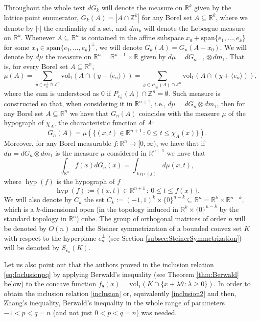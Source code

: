 \documentclass[10pt]{amsart}
\def\hyp{\mathop\mathrm{hyp}\nolimits}
\def\R{\mathbb{R}}
\def\Z{\mathbb{Z}}
\def\vol{\mathrm{vol}}
\numberwithin{equation}{section}
\begin{document}
Throughout the whole text $dG_k$ will denote the measure on $\R^k$ given by the lattice point enumerator, $G_k(A)=|A\cap\Z^k|$ for any Borel set $A\subseteq\R^k$, where we denote by $|\cdot|$ the cardinality of a set, and $dm_k$ will denote the Lebesgue measure on $\R^k$. Whenever $A\subseteq\R^n$ is contained in the affine subspace $x_0+\textrm{span}\{e_1,\dots,e_k\}$ for some $x_0\in\textrm{span}\{e_1,\dots,e_k\}^\perp$, we will denote $G_k(A)=G_n(A-x_0)$. We will denote by $d\mu$ the measure on $\R^n=\R^{n-1}\times\R$ given by $d\mu=d G_{n-1}\otimes dm_1$. That is, for every Borel set $A\subseteq\R^n$,
\begin{equation}\label{eq:DefinitionMu}
\mu(A)=\sum_{y\in e_n^\perp\cap \Z^n}\vol_1(A\cap(y+\langle e_n\rangle))=\sum_{y\in P_{e_n^\perp}(A)\cap\Z^n}\vol_1(A\cap(y+\langle e_n\rangle)),
\end{equation}
where the sum is understood as $0$ if $P_{e_n^\perp}(A)\cap\Z^n=\emptyset$. Such measure is constructed so that, when considering it in $\R^{n+1}$, i.e., $d\mu=dG_{n}\otimes dm_1$, then for any Borel set $A\subseteq\R^n$ we have that $G_n(A)$ coincides with the measure $\mu$ of the hypograph of $\chi_A$, the characteristic function of $A$:
$$
G_n(A)=\mu\left(\{(x,t)\in\R^{n+1}\,:\,0\leq t\leq\chi_A(x)\}\right).
$$
Moreover, for any Borel measurable $f:\R^n\to[0,\infty)$, we have that if $d\mu=dG_{n}\otimes dm_1$ is the measure $\mu$ considered in $\R^{n+1}$ we have that
$$
\int_{\R^n}f(x)dG_n(x)=\int_{\hyp(f)}d\mu(x,t),
$$
where $\hyp(f)$ is the hypograph of $f$
$$
\hyp(f):=\{(x,t)\in\R^{n+1}\,:\,0\leq t\leq f(x)\}.
$$
We will also denote by $C_k$ the set $C_k:=(-1,1)^k\times\{0\}^{n-k}\subseteq\R^n=\R^k\times\R^{n-k}$, which is a $k$-dimensional open (in the topology induced in $\R^k\times\{0\}^{n-k}$ by the standard topology in $\R^n$) cube. The group of orthogonal matrices of order $n$ will be denoted by $O(n)$ and the Steiner symmetrization of a bounded convex set $K$ with respect to the hyperplane $e_n^\perp$ (see Section \ref{subsec:SteinerSymmetrization}) will be denoted by $S_{e_n}(K)$.

Let us also point out that the authors proved in \cite[Theorem 5.5]{GZ} the inclusion relation \eqref{eq:Inclusionpq} by applying Berwald's inequality (see Theorem \ref{thm:Berwald} below) to the concave function $f_\theta(x)=\vol_1(K\cap\{x+\lambda\theta\,:\lambda\geq 0\})$. In order to obtain the inclusion relation \eqref{inclusion} or, equivalently \eqref{inclusion2} and then, Zhang's inequality, Berwald's inequality in the whole range of parameters $-1<p<q=n$ (and not just $0<p<q=n$) was needed.
\end{document}
